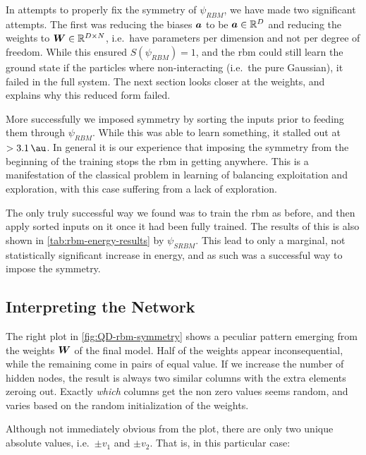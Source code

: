 \documentclass[Thesis.tex]{subfiles}
\begin{document}
In attempts to properly fix the symmetry of $\psi_{RBM}$, we have made two
significant attempts. The first was reducing the biases $\bm{a}$ to be $\bm{a}\in\mathbb{R}^D$ and reducing the weights to $\bm{W}\in\mathbb{R}^{D\times N}$,
i.e.\ have parameters per dimension and not per degree of freedom. While this ensured
$S(\psi_{RBM})=1$, and the \gls{rbm} could still learn the ground state if the
particles where non-interacting (i.e.\ the pure Gaussian), it failed in the full
system. The next section looks closer at the weights, and explains why this
reduced form failed.

More successfully we imposed symmetry by sorting the inputs prior to feeding
them through $\psi_{RBM}$. While this was able to learn something, it stalled
out at $>\SI{3.1}{\au}$. In general it is our experience that imposing the
symmetry from the beginning of the training stops the \gls{rbm} in getting anywhere.
This is a manifestation of the classical problem in learning of balancing
exploitation and exploration, with this case suffering from a lack of exploration.

The only truly successful way we found was to train the \gls{rbm} as before, and then
apply sorted inputs on it once it had been fully trained. The results of this is
also shown in \cref{tab:rbm-energy-results} by $\psi_{SRBM}$. This lead to only a
marginal, not statistically significant increase in energy, and as such was a
successful way to impose the symmetry.

\subsection{Interpreting the Network}

The right plot in \cref{fig:QD-rbm-symmetry} shows a peculiar pattern emerging
from the weights $\bm{W}$ of the final model. Half of the weights appear
inconsequential, while the remaining come in pairs of equal value. If we
increase the number of hidden nodes, the result is always two similar columns with the extra elements
zeroing out. Exactly \emph{which} columns get the non zero values seems random,
and varies based on the random initialization of the weights.

Although not immediately obvious from the plot, there are only two unique
absolute values, i.e.\ $\pm v_1$ and $\pm v_2$. That is, in this particular
case:
\end{document}

